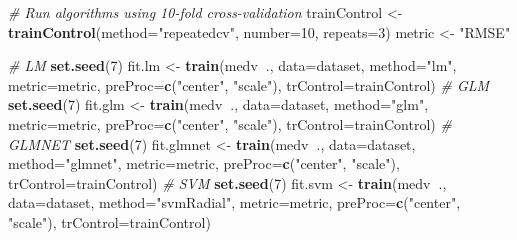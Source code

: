 \documentclass[]{book}
\newenvironment{Shaded}{\begin{snugshade}}{\end{snugshade}}
\newcommand{\CommentTok}[1]{\textcolor[rgb]{0.56,0.35,0.01}{\textit{#1}}}
\newcommand{\DataTypeTok}[1]{\textcolor[rgb]{0.13,0.29,0.53}{#1}}
\newcommand{\DecValTok}[1]{\textcolor[rgb]{0.00,0.00,0.81}{#1}}
\newcommand{\KeywordTok}[1]{\textcolor[rgb]{0.13,0.29,0.53}{\textbf{#1}}}
\newcommand{\NormalTok}[1]{#1}
\newcommand{\OperatorTok}[1]{\textcolor[rgb]{0.81,0.36,0.00}{\textbf{#1}}}
\newcommand{\StringTok}[1]{\textcolor[rgb]{0.31,0.60,0.02}{#1}}
\begin{document}
\begin{Shaded}
\begin{Highlighting}[]
\CommentTok{# Run algorithms using 10-fold cross-validation}
\NormalTok{trainControl <-}\StringTok{ }\KeywordTok{trainControl}\NormalTok{(}\DataTypeTok{method=}\StringTok{"repeatedcv"}\NormalTok{, }\DataTypeTok{number=}\DecValTok{10}\NormalTok{, }\DataTypeTok{repeats=}\DecValTok{3}\NormalTok{)}
\NormalTok{metric <-}\StringTok{ "RMSE"}

\CommentTok{# LM}
\KeywordTok{set.seed}\NormalTok{(}\DecValTok{7}\NormalTok{)}
\NormalTok{fit.lm <-}\StringTok{ }\KeywordTok{train}\NormalTok{(medv}\OperatorTok{~}\NormalTok{., }\DataTypeTok{data=}\NormalTok{dataset, }\DataTypeTok{method=}\StringTok{"lm"}\NormalTok{, }
                \DataTypeTok{metric=}\NormalTok{metric, }\DataTypeTok{preProc=}\KeywordTok{c}\NormalTok{(}\StringTok{"center"}\NormalTok{, }\StringTok{"scale"}\NormalTok{), }
                \DataTypeTok{trControl=}\NormalTok{trainControl)}
\CommentTok{# GLM}
\KeywordTok{set.seed}\NormalTok{(}\DecValTok{7}\NormalTok{)}
\NormalTok{fit.glm <-}\StringTok{ }\KeywordTok{train}\NormalTok{(medv}\OperatorTok{~}\NormalTok{., }\DataTypeTok{data=}\NormalTok{dataset, }\DataTypeTok{method=}\StringTok{"glm"}\NormalTok{, }
                 \DataTypeTok{metric=}\NormalTok{metric, }\DataTypeTok{preProc=}\KeywordTok{c}\NormalTok{(}\StringTok{"center"}\NormalTok{, }\StringTok{"scale"}\NormalTok{), }
                 \DataTypeTok{trControl=}\NormalTok{trainControl)}
\CommentTok{# GLMNET}
\KeywordTok{set.seed}\NormalTok{(}\DecValTok{7}\NormalTok{)}
\NormalTok{fit.glmnet <-}\StringTok{ }\KeywordTok{train}\NormalTok{(medv}\OperatorTok{~}\NormalTok{., }\DataTypeTok{data=}\NormalTok{dataset, }\DataTypeTok{method=}\StringTok{"glmnet"}\NormalTok{, }
                    \DataTypeTok{metric=}\NormalTok{metric, }
                    \DataTypeTok{preProc=}\KeywordTok{c}\NormalTok{(}\StringTok{"center"}\NormalTok{, }\StringTok{"scale"}\NormalTok{), }
                    \DataTypeTok{trControl=}\NormalTok{trainControl)}
\CommentTok{# SVM}
\KeywordTok{set.seed}\NormalTok{(}\DecValTok{7}\NormalTok{)}
\NormalTok{fit.svm <-}\StringTok{ }\KeywordTok{train}\NormalTok{(medv}\OperatorTok{~}\NormalTok{., }\DataTypeTok{data=}\NormalTok{dataset, }\DataTypeTok{method=}\StringTok{"svmRadial"}\NormalTok{, }
                 \DataTypeTok{metric=}\NormalTok{metric, }
                 \DataTypeTok{preProc=}\KeywordTok{c}\NormalTok{(}\StringTok{"center"}\NormalTok{, }\StringTok{"scale"}\NormalTok{), }
                 \DataTypeTok{trControl=}\NormalTok{trainControl)}

\end{Highlighting}
\end{Shaded}
\end{document}
